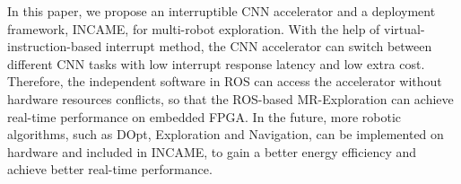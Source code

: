 \label{sec:conclusion}

In this paper, we propose an interruptible CNN accelerator and a deployment framework, INCAME, for multi-robot exploration. 
With the help of virtual-instruction-based interrupt method, the CNN accelerator can switch between different CNN tasks with low interrupt response latency and low extra cost. Therefore, the independent software in ROS can access the accelerator without hardware resources conflicts, so that the ROS-based MR-Exploration can achieve real-time performance on embedded FPGA. In the future, more robotic algorithms, such as DOpt, Exploration and Navigation, can be implemented on hardware and included in INCAME, to gain a better energy efficiency and achieve better real-time performance.

